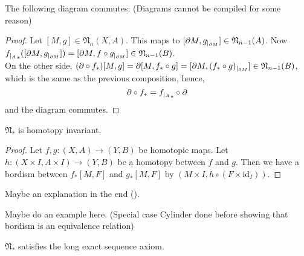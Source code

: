 \documentclass[a4paper,11pt]{article}
\begin{document}
\begin{lemma}
    The following diagram commutes: (Diagrams cannot be compiled for some reason)
    \begin{center}
    \end{center}
\end{lemma}

\begin{proof}
    Let \([M,g]\in\mathfrak{N}_n(X,A)\). This maps to \([\partial M,g_{|_{\partial M}}]\in\mathfrak{N}_{n-1}(A)\).
    Now \({f_{|_{A}}}_\ast([\partial M,g_{|_{\partial M}}])=[\partial M,f\circ g_{|_{\partial M}}]\in \mathfrak{N}_{n-1}(B)\).\\
    On the other side, \((\partial\circ f_\ast)[M,g]=\partial [M,f_\ast\circ g]=[\partial M,(f_\ast\circ g)_{|_{\partial M}}]\in \mathfrak{N}_{n-1}(B)\), which is the same as the previous composition, hence,
    \[\partial\circ f_\ast={f_{|_{A}}}_\ast\circ \partial\]
    and the diagram commutes.
\end{proof}

\begin{lemma}\cite[II, Satz 3.1]{brocker}\label{htpy inv}
    \(\mathfrak{N}_\ast\) is homotopy invariant.
\end{lemma}

\begin{proof}\cite{brocker}\cite[5.5]{conner}
    Let \(f,g:(X,A)\to(Y,B)\) be homotopic maps. Let \(h:(X\times I,A\times I)\to (Y,B)\) be a homotopy between \(f\) and \(g\). Then we have a bordism between \(f_\ast[M,F]\) and \(g_\ast[M,F]\) by \((M\times I, h\circ (F\times\mathrm{id}_I))\).
\end{proof}
Maybe an explanation in the end (\cite{conner}).

Maybe do an example here. (Special case Cylinder done before showing that bordism is an equivalence relation)

\begin{lemma}\label{les}
    \(\mathfrak{N}_\ast\) satisfies the long exact sequence axiom.
\end{lemma}
\end{document}
